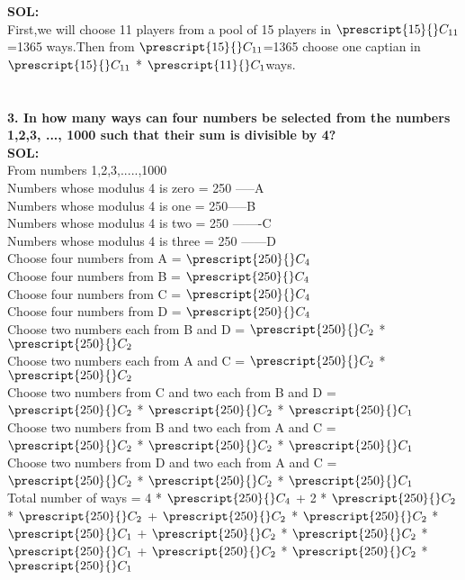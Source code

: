 \documentclass[8pt,a4paper]{article}
\newcommand\Mycomb[2][n]{\prescript{#1\mkern-0.5mu}{}C_{#2}}
\begin{document}
\textbf{SOL:}\\First,we will choose 11 players from a pool of 15 players in $\Mycomb[15]{11}$=1365 ways.Then from $\Mycomb[15]{11}$=1365 choose one captian in $\Mycomb[15]{11}$ * $\Mycomb[11]{1}$ways.\\


\section{}

\textbf{3. In how many ways can four numbers be selected from the numbers 1,2,3, ..., 1000 such
that their sum is divisible by 4?}\\

\textbf{SOL:}\\From numbers 1,2,3,.....,1000\\Numbers whose modulus 4 is zero = 250 -----A\\Numbers whose modulus 4 is one = 250-----B\\Numbers whose modulus 4 is two = 250 -------C \\ Numbers whose modulus 4 is three = 250 ------D\\Choose four numbers from A = $\Mycomb[250]{4}$\\Choose four numbers from B = $\Mycomb[250]{4}$\\Choose four numbers from C = $\Mycomb[250]{4}$ \\Choose four numbers from D = $\Mycomb[250]{4}$\\Choose two numbers each from B and D = $\Mycomb[250]{2}$ * $\Mycomb[250]{2}$\\Choose two numbers each from A and C = $\Mycomb[250]{2}$ * $\Mycomb[250]{2}$\\Choose two numbers from C and two each from B and D = $\Mycomb[250]{2}$ * $\Mycomb[250]{2}$ * $\Mycomb[250]{1}$\\Choose two numbers from B and two each from A and C = $\Mycomb[250]{2}$ * $\Mycomb[250]{2}$ * $\Mycomb[250]{1}$\\Choose two numbers from D and two each from A and C = $\Mycomb[250]{2}$ * $\Mycomb[250]{2}$ * $\Mycomb[250]{1}$\\Total number of ways = 4 * $\Mycomb[250]{4}$ + 2 * $\Mycomb[250]{2}$ * $\Mycomb[250]{2}$ + $\Mycomb[250]{2}$ * $\Mycomb[250]{2}$ * $\Mycomb[250]{1}$ + $\Mycomb[250]{2}$ * $\Mycomb[250]{2}$ * $\Mycomb[250]{1}$ + $\Mycomb[250]{2}$ * $\Mycomb[250]{2}$ * $\Mycomb[250]{1}$\\ 
\end{document}
